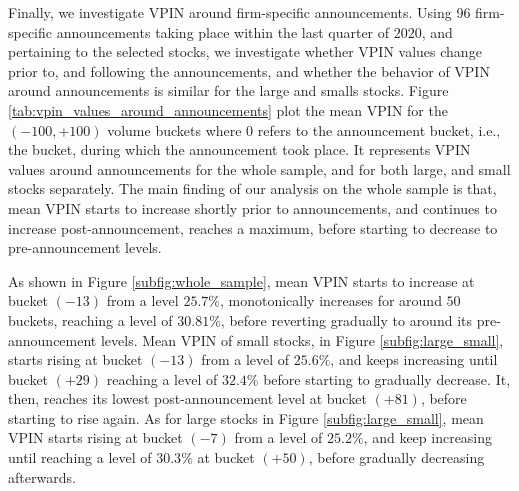 Finally, we investigate VPIN around firm-specific announcements. Using 96 firm-specific announcements taking place within the last quarter of \(2020\), and pertaining to the selected stocks, we investigate whether VPIN values change prior to, and following the announcements, and whether the behavior of VPIN around announcements is similar for the large and smalls stocks. Figure \ref{tab:vpin_values_around_announcements} plot the mean VPIN for the \(\left(-100, +100\right)\) volume buckets where \(0\) refers to the announcement bucket, i.e., the bucket, during which the announcement took place. It  represents VPIN values around announcements for the whole sample, and for both large, and small stocks separately. 
The main finding of our analysis on the whole sample is that, mean VPIN starts to increase shortly prior to announcements, and continues to increase post-announcement, reaches a maximum, before starting to decrease to pre-announcement levels.

As shown in Figure \ref{subfig:whole_sample}, mean VPIN starts to increase at bucket $(-13)$ from a level $25.7\%$, monotonically increases for around $50$ buckets, reaching a level of $30.81\%$, before reverting gradually to around its pre-announcement levels.  Mean VPIN of small stocks, in Figure \ref{subfig:large_small}, starts rising at bucket $(-13)$ from a level of $25.6\%$,  and keeps increasing until bucket $(+29)$ reaching a level of $32.4\%$ before starting to gradually decrease. It, then, reaches its lowest post-announcement level at bucket $(+81)$, before starting to rise again.  As for large stocks in Figure \ref{subfig:large_small}, mean VPIN starts rising at bucket $(-7)$ from a level of $25.2\%$, and keep increasing until reaching a level of $30.3\%$ at bucket $(+50)$, before gradually decreasing afterwards.

